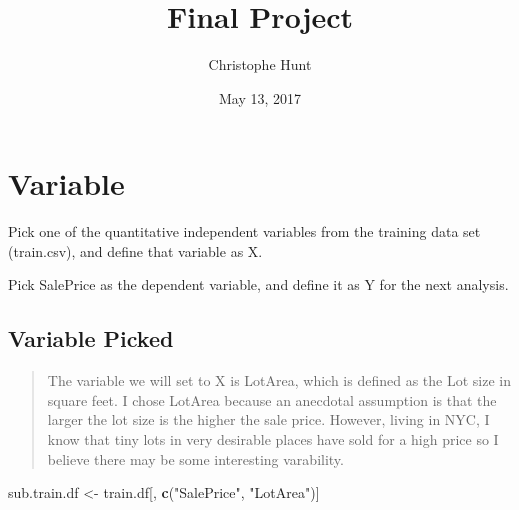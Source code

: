 \documentclass[]{article}
\title{Final Project}
\author{Christophe Hunt}
\date{May 13, 2017}
\newenvironment{Shaded}{\begin{snugshade}}{\end{snugshade}}
\newcommand{\KeywordTok}[1]{\textcolor[rgb]{0.13,0.29,0.53}{\textbf{{#1}}}}
\newcommand{\DataTypeTok}[1]{\textcolor[rgb]{0.13,0.29,0.53}{{#1}}}
\newcommand{\StringTok}[1]{\textcolor[rgb]{0.31,0.60,0.02}{{#1}}}
\newcommand{\NormalTok}[1]{{#1}}
\begin{document}
\maketitle

{
\setcounter{tocdepth}{2}
\tableofcontents
}
\newpage

\section{Variable}\label{variable}

Pick one of the quantitative independent variables from the training
data set (train.csv), and define that variable as X.

Pick SalePrice as the dependent variable, and define it as Y for the
next analysis.

\subsection{Variable Picked}\label{variable-picked}

\begin{quote}
The variable we will set to X is LotArea, which is defined as the Lot
size in square feet. I chose LotArea because an anecdotal assumption is
that the larger the lot size is the higher the sale price. However,
living in NYC, I know that tiny lots in very desirable places have sold
for a high price so I believe there may be some interesting varability.
\end{quote}

\begin{Shaded}
\end{Shaded}

\begin{Shaded}
\begin{Highlighting}[]
\NormalTok{sub.train.df <-}\StringTok{ }\NormalTok{train.df[, }\KeywordTok{c}\NormalTok{(}\StringTok{"SalePrice"}\NormalTok{, }\StringTok{"LotArea"}\NormalTok{)]}
\end{Highlighting}
\end{Shaded}
\end{document}
